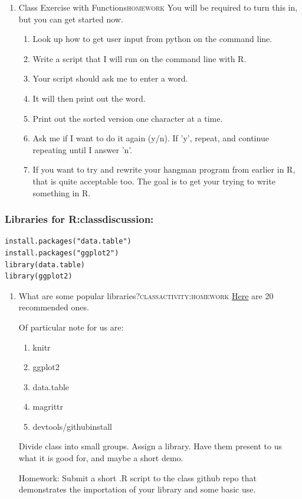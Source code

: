 \documentclass{article}
\begin{document}
\begin{enumerate}
\item Class Exercise with Functions\hfill{}\textsc{homework}
\label{sec:org1dcdb06}
You will be required to turn this in, but you can get started now. 
\begin{enumerate}
\item Look up how to get user input from python on the command line.
\item Write a script that I will run on the command line with R.
\item Your script should ask me to enter a word.
\item It will then print out the word.
\item Print out the sorted version one character at a time.
\item Ask me if I want to do it again (y/n). If 'y', repeat, and continue repeating until I answer 'n'.
\item If you want to try and rewrite your hangman program from earlier in R, that is quite acceptable too. The goal is to get your trying to write something in R.
\end{enumerate}
\end{enumerate}
\subsubsection{Libraries for R:classdiscussion:}
\label{sec:org04baac8}
\begin{verbatim}
install.packages("data.table")
install.packages("ggplot2")
library(data.table)
library(ggplot2)
\end{verbatim}
\begin{enumerate}
\item What are some popular libraries?\hfill{}\textsc{classactivity:homework}
\label{sec:orga5b9319}
\href{https://pythontips.com/2013/07/30/20-python-libraries-you-cant-live-without/}{Here} are 20 recommended ones.

Of particular note for us are:
\begin{enumerate}
\item knitr
\item ggplot2
\item data.table
\item magrittr
\item devtools/githubinstall
\end{enumerate}

Divide class into small groups. Assign a library. Have them present to us what it is good for, and maybe a short demo. 

Homework: Submit a short .R script to the class github repo that demonstrates the importation of your library and some basic use.
\end{enumerate}
\end{document}
